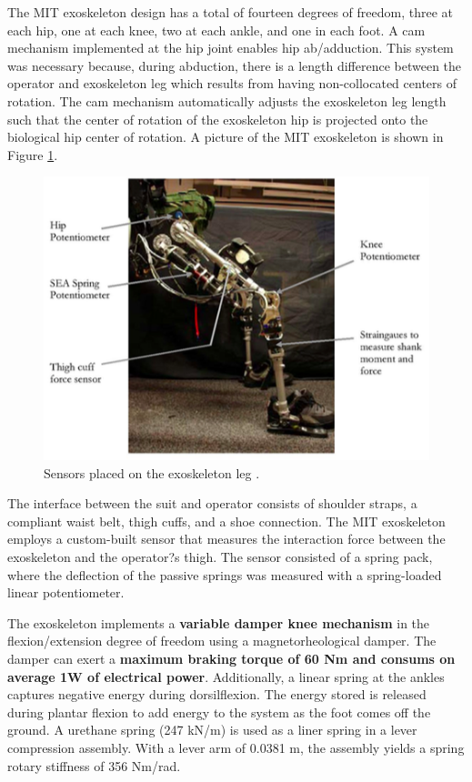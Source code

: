\begin{refsection}
 The MIT exoskeleton design has a total of fourteen degrees of freedom, three at each hip, one at each knee, two at each ankle, and one in each foot.  A cam mechanism implemented at the hip joint enables hip ab/adduction.  This system was necessary because, during abduction, there is a length difference between the operator and exoskeleton leg which results from having non-collocated centers of rotation.  The cam mechanism automatically adjusts the exoskeleton leg length such that the center of rotation of the exoskeleton hip is projected onto the biological hip center of rotation.  A picture of the MIT exoskeleton is shown in Figure \ref{fig:MITsuit}.
 \begin{figure}[thpb]
\centering
\includegraphics[width=3.in]{exos/figs/MIT/MITsuit}
  \caption{ Sensors placed on the exoskeleton leg \cite{mit_control_2006}.}
 \label{fig:MITsuit}   
 \end{figure} 
% 
 The interface between the suit and operator consists of shoulder straps, a compliant waist belt, thigh cuffs, and a shoe connection.  The MIT exoskeleton employs a custom-built sensor that measures the interaction force between the exoskeleton and the operator?s thigh. The sensor consisted of a spring pack, where the deflection of the passive springs was measured with a spring-loaded linear potentiometer.  

 The exoskeleton implements a {\bf variable damper knee mechanism} in the flexion/extension degree of freedom using a magnetorheological damper.  The damper can exert a {\bf maximum braking torque of 60 Nm and consums on average 1W of electrical power}.  Additionally, a linear spring at the ankles captures negative energy during dorsilflexion.  The energy stored is released during plantar flexion to add energy to the system as the foot comes off the ground. A urethane spring (247 kN/m) is used as a liner spring in a lever compression assembly.  With a lever arm of 0.0381 m, the assembly yields a spring rotary stiffness of 356 Nm/rad. 
 

\end{refsection}

